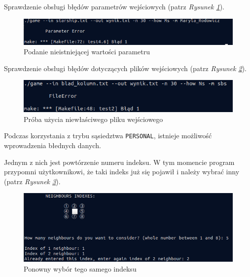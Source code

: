 \documentclass[a4paper]{article}
\begin{document}
\newpage

Sprawdzenie obs\l{}ugi b\l{}\k{e}d\'ow parametr\'ow wej\'sciowych (patrz \textit{Rysunek \ref{fig:test2}}).
\begin{figure}[h!]
        \centering
        \includegraphics[scale=0.45]{TheOneMarylaunknown}
	\caption{Podanie nieistniej\k{a}cej warto\'sci parametru}
        \label{fig:test2}
\end{figure}

Sprawdzenie obs\l{}ugi b\l{}\k{e}d\'ow dotycz\k{a}cych plik\'ow wej\'sciowych (patrz \textit{Rysunek \ref{fig:test3}}).
\begin{figure}[h!]
        \centering
        \includegraphics[scale=0.68]{unknown}
	\caption{Pr\'oba u\.zycia niew\l{}a\'sciwego pliku wej\'sciowego}
        \label{fig:test3}
\end{figure}

Podczas korzystania z trybu s\k{a}siedztwa \texttt{PERSONAL}, istnieje mo\.zliwo\'s\'c wprowadzenia b\l{}ednych danych.


Jednym z nich jest powt\'orzenie numeru indeksu.
W tym momencie program przypomni u\.zytkownikowi, \.ze taki indeks ju\.z si\k{e} pojawi\l{} i nale\.zy wybra\'c inny (patrz \textit{Rysunek \ref{fig:test4}}).
\begin{figure}[h!]
        \centering
        \includegraphics[scale=0.4]{powtorz}
        \caption{Ponowny wyb\'or tego samego indeksu}
        \label{fig:test4}
\end{figure}
\end{document}
